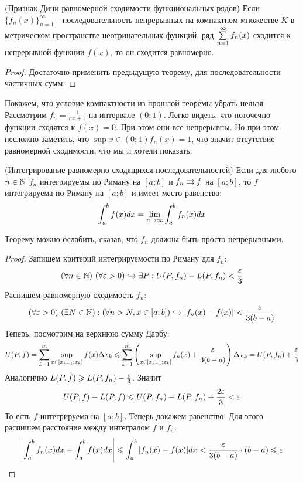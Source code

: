 \begin{theorem} (Признак Дини равномерной сходимости функциональных рядов) Если $\{f_n(x)\}_{n = 1}^\infty$ - последовательность непрерывных на компактном множестве $K$  в метрическом пространстве неотрицательных функций,  ряд $\sum\limits_{n=1}^{\infty}f_n(x)$ сходится к непрерывной функции $f(x)$, то он сходится равномерно. 
\end{theorem}

\begin{proof}
	Достаточно применить предыдущую теорему, для последовательности частичных сумм.
\end{proof}

\begin{example}
	Покажем, что условие компактности из прошлой теоремы убрать нельзя. Рассмотрим $f_n = \frac{1}{nx+1}$ на интервале $(0; 1)$. Легко видеть, что поточечно функции сходятся к $f(x) = 0$. При этом они все непрерывны. Но при этом несложно заметить, что $\sup\limits{x\in(0; 1)}f_n(x) = 1$, что значит отсутствие равномерной сходимости, что мы и хотели показать.
\end{example}

\begin{theorem} (Интегрирование равномерно сходящихся последовательностей)
	Если для любого $n \in \mathbb{N}$ $f_n$ интегрируемы по Риману на $[a; b]$ и $f_n \rightrightarrows f$ на $[a; b]$, то $f$ интегрируема по Риману на $[a; b]$ и имеет место равенство:
	\[
		\int_a^b f(x)dx = \lim\limits_{n \to \infty} \int_a^b f_n(x)dx
	\]
\end{theorem}

\begin{note}
	Теорему можно ослабить, сказав, что $f_n$ должны быть просто непрерывными.
\end{note}

\begin{proof}
	Запишем критерий интегрируемости по Риману для $f_n$:
	\[
		(\forall n \in \mathbb{N})\ (\forall \varepsilon > 0)\hookrightarrow \exists P : U(P, f_n) - L(P, f_n) < \frac{\varepsilon}{3}
	\]
	Распишем равномерную сходимость $f_n$:
	\[
		(\forall \varepsilon > 0)\ (\exists N \in \mathbb{N}) : (\forall n > N, x \in [a; b]) \hookrightarrow |f_n(x) - f(x)| < \frac{\varepsilon}{3(b - a)}
	\]
	Теперь, посмотрим на верхнюю сумму Дарбу:
	\[
		U(P, f) = \sum\limits_{k = 1}^m \sup\limits_{x \in [x_{k - 1}; x_k]} f(x) \Delta x_k \leqslant \sum\limits_{k = 1}^m \left(\sup\limits_{x \in [x_{k - 1}; x_k]} f_n(x) + \frac{\varepsilon}{3(b - a)}\right) \Delta x_k = U(P, f_n) + \frac{\varepsilon}{3}
	\]
	Аналогично $L(P, f) \geqslant L(P, f_n) - \frac{\varepsilon}{3}$. Значит
	\[
		U(P, f) - L(P, f) \leqslant U(P, f_n) - L(P, f_n) + \frac{2\varepsilon}{3} < \varepsilon
	\]
	То есть $f$ интегрируема на $[a; b]$. Теперь докажем равенство. Для этого распишем расстояние между интегралом $f$ и $f_n$:
	\[
		\left|\int_a^b f_n(x)dx - \int_a^b f(x)dx\right| \leqslant \int_a^b |f_n(x) - f(x)|dx < \frac{\varepsilon}{3(b - a)} \cdot (b - a) \leqslant \varepsilon
	\]
\end{proof}

